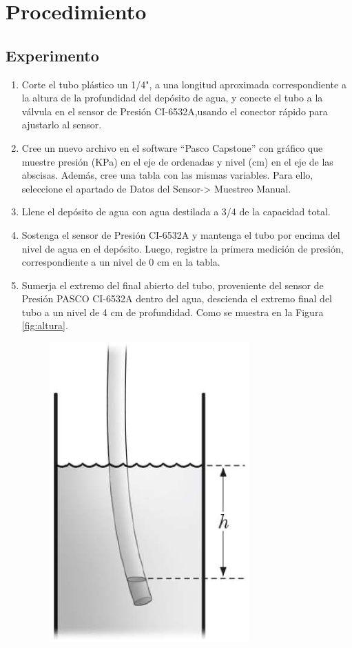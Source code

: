 \documentclass[12pt,letterpaper]{report}
\newcommand{\pro}{Procedimiento}
\begin{document}
\section{\pro}
\subsection{Experimento}
\begin{enumerate}
    
    \item Corte el tubo plástico un 1/4", a una longitud aproximada correspondiente a la altura de la profundidad del depósito de agua, y conecte el tubo a la válvula en el sensor de Presión CI-6532A,usando el conector rápido para ajustarlo al sensor.
    \item Cree un nuevo archivo en el software “Pasco Capstone” con gráfico que muestre presión (KPa) en el eje de ordenadas y nivel (cm) en el eje de las abscisas. Además, cree una tabla con las mismas variables. Para ello, seleccione el apartado de Datos del Sensor-> Muestreo Manual.
    \item Llene el depósito de agua con agua destilada a 3/4 de la capacidad total.
    \item Sostenga el sensor de Presión CI-6532A y mantenga el tubo por encima del nivel de agua en el depósito. Luego, registre la primera medición de presión, correspondiente a un nivel de 0 cm en la tabla. 
    \item Sumerja el extremo del final abierto del tubo, proveniente del sensor de Presión PASCO CI-6532A dentro del agua, descienda el extremo final del tubo a un nivel de 4 cm de profundidad. Como se muestra en la Figura \ref{fig:altura}.
    \begin{figure} [!ht]
        \centering
        \includegraphics{fig/Nivel/Altura.PNG}

\end{figure}
\end{enumerate}
\end{document}
